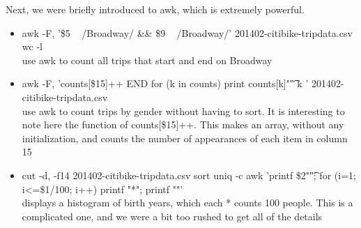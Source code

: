 Next, we were briefly introduced to awk, which is extremely powerful.
\begin{itemize}
    \item awk -F, '\$5 ~ /Broadway/ \&\& \$9 ~ /Broadway/' 201402-citibike-tripdata.csv \textbar wc -l \\
    use awk to count all trips that start and end on Broadway
    \item awk -F, '{counts[\$15]++} END {for (k in counts) print counts[k]"\t" k }' 201402-citibike-tripdata.csv \\
    use awk to count trips by gender without having to sort. It is interesting to note here the function of {counts[\$15]++}. This makes an array, without any initialization, and counts the number of appearances of each item in column 15
    \item cut -d, -f14 201402-citibike-tripdata.csv \textbar sort \textbar uniq -c \textbar awk '{printf \$2"\t"; for (i=1; i<=\$1/100; i++) printf "*"; printf "\n"}' \\
    displays a histogram of birth years, which each * counts 100 people. This is a complicated one, and we were a bit too rushed to get all of the details
\end{itemize}

